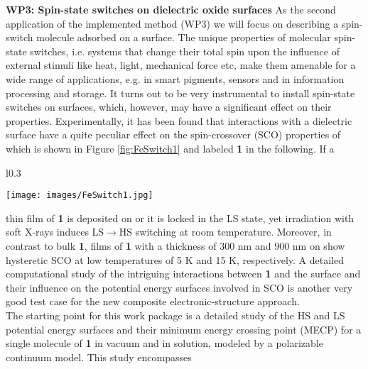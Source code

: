 \documentclass[a4paper,11pt,headings=normal]{scrartcl}
\begin{document}
\begin{itemize}
\noindent
\textbf{WP3: Spin-state switches on dielectric oxide surfaces}
As the second application of the implemented method (WP3) we will focus on 
describing a spin-switch molecule adsorbed on a surface. The unique properties of 
molecular spin-state switches, i.e. systems that change their total
spin upon the influence of external stimuli like heat, light, mechanical force etc, make them amenable for a
wide range of applications, e.g. in smart pigments, sensors and in information
processing and storage. It turns out to be very instrumental to install spin-state switches on surfaces, which, however, may have a significant effect on their properties.\autocite{Kuch2021,Ruben2021} 
Experimentally, it has been found that interactions with a dielectric surface 
have a quite peculiar effect on the spin-crossover (SCO) properties of 
\ce{Fe(H2B(pz)2)2(bpy)]} 
which is shown in Figure \ref{fig:FeSwitch1} and labeled \textbf{1} in the 
following.\autocite{Dowben2017,Dowben2019a} If a 
\begin{wrapfigure}{l}{0.3\textwidth}
	\vspace{-2em}  
	\begin{center}
		\texttt{[image: images/FeSwitch1.jpg]}
	\end{center}
	\vspace{-1.5em}  
	\caption{Spin crossover complex \ce{Fe(H2B(pz)2)2(bpy)]} labeled \textbf{1} 
		in this proposal. Image reproduced from reference \cite{Dowben2019a}.}
	\label{fig:FeSwitch1}
	\vspace{-1em}  
\end{wrapfigure}
thin 
film of \textbf{1} is 
deposited on  or  it is locked in the LS state, yet 
irradiation with soft X-rays 
induces LS$\rightarrow$HS switching at room 
temperature.\autocite{Dowben2017} Moreover, in contrast to bulk \textbf{1},  
films of \textbf{1} with a 
thickness of 300 nm and 900 nm on  show hysteretic SCO at low 
temperatures of 5 K and 15 K, respectively.\autocite{Dowben2019a} A detailed 
computational study of the intriguing interactions between \textbf{1} and the 
surface and their influence on the potential energy surfaces involved in SCO  
is another very good test case for the new composite electronic-structure 
approach.\\
The starting point for this work package is a detailed study of the HS and LS 
potential energy surfaces and their minimum energy crossing point (MECP) for a  
single molecule of \textbf{1} in vacuum
and in solution, modeled by a polarizable continuum model. This study encompasses 

\end{itemize}
\end{document}
